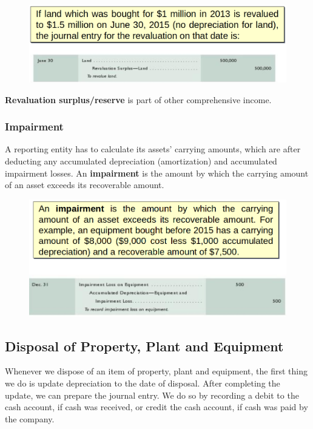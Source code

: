 \documentclass[../main.tex]{subfiles}
\begin{document}
	\begin{figure}[ht]
		\centering
		\includegraphics[width=1\columnwidth]{images/c8/revaluation_eg.png}
	\end{figure}

	\textbf{Revaluation surplus/reserve} is part of other comprehensive income.
	
	\subsubsection{Impairment}
	
	 A reporting entity has to calculate its assets’ carrying amounts, which 
	 are  after deducting any accumulated depreciation (amortization) and 
	 accumulated impairment losses. An \textbf{impairment} is the amount by 
	 which the carrying amount of an asset exceeds its recoverable amount.
	
		
	\begin{figure}[ht]
		\centering
		\includegraphics[width=1\columnwidth]{images/c8/impairment_eg.png}
	\end{figure}
	
	
	\subsection{Disposal of Property, Plant and Equipment}
	
	Whenever we dispose of an item of property, plant and equipment, the first 
	thing we do is update depreciation to the date of disposal. 
	After 
	completing the update, we can prepare the journal entry. We do so by 
	recording a debit to the cash account, if cash was received, or credit the 
	cash account, if cash was paid by the company. 
	
\end{document}
